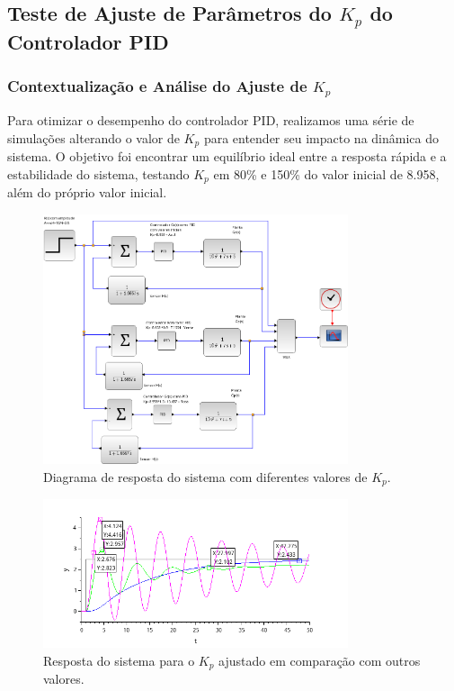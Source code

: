 \subsection{Teste de Ajuste de Parâmetros do \( K_p \) do Controlador PID}

\subsubsection{Contextualização e Análise do Ajuste de \( K_p \)}
Para otimizar o desempenho do controlador PID, realizamos uma série de simulações alterando o valor de \( K_p \) para entender seu impacto na dinâmica do sistema. O objetivo foi encontrar um equilíbrio ideal entre a resposta rápida e a estabilidade do sistema, testando \( K_p \) em 80\% e 150\% do valor inicial de 8.958, além do próprio valor inicial.

\begin{figure}[H]
    \centering
    \includegraphics[width=0.8\textwidth]{6-atividade/assets/c/diagrama-pid-ajustando-kp.png}
    \caption{Diagrama de resposta do sistema com diferentes valores de \( K_p \).}
    \label{fig:diagrama-comparacao-proporcional-pid}
\end{figure}

\begin{figure}[H]
    \centering
    \includegraphics[width=0.8\textwidth]{6-atividade/assets/c/pid-ajustando-kp.png}
    \caption{Resposta do sistema para o \( K_p \) ajustado em comparação com outros valores.}
    \label{fig:comparacao-proporcional-pid}
\end{figure}

